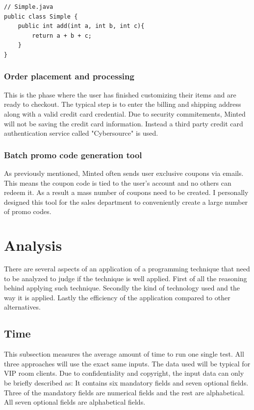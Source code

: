 \documentclass[12pt]{article}
\begin{document}
\begin{lstlisting}
// Simple.java
public class Simple {
	public int add(int a, int b, int c){
		return a + b + c;
	}
}

\end{lstlisting}

\subsubsection{Order placement and processing}
This is the phase where the user has finished customizing their items and are ready to checkout. The typical step is to enter the billing and shipping address along with a valid credit card credential. Due to security commitements, Minted will not be saving the credit card information. Instead a third party credit card authentication service called "Cybersource" is used.\\

\subsubsection{Batch promo code generation tool}
As previously mentioned, Minted often sends user exclusive coupons via emails. This means the coupon code is tied to the user's account and no others can redeem it. As a result a mass number of coupons need to be created. I personally designed this tool for the sales department to conveniently create a large number of promo codes.\\
\newpage

\section{Analysis}
There are several aspects of an application of a programming technique that need to be analyzed to judge if the technique is well applied. First of all the reasoning behind applying such technique. Secondly the kind of technology used and the way it is applied. Lastly the efficiency of the application compared to other alternatives.\\
\subsection{Time}
This subsection measures the average amount of time to run one single test. All three approaches will use the exact same inputs. The data used will be typical for VIP room clients. Due to confidentiality and copyright, the input data can only be briefly described as:  It contains six mandatory fields and seven optional fields. Three of the mandatory fields are numerical fields and the rest are alphabetical. All seven optional fields are alphabetical fields.\\
\end{document}
